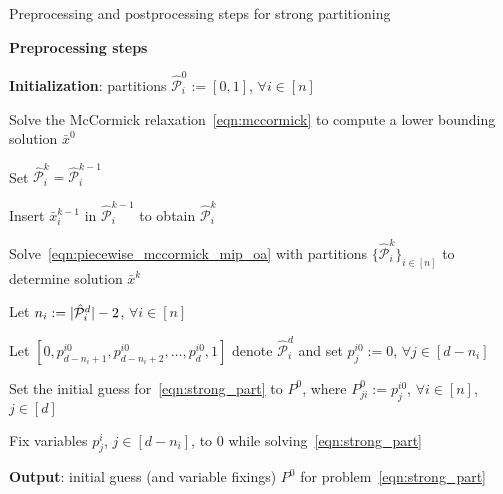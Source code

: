 \documentclass{article}
\DeclarePairedDelimiter\abs{\lvert}{\rvert}%
\begin{document}
\begin{algorithm}[t]
\caption{Preprocessing and postprocessing steps for strong partitioning}
\label{alg:enhancements}
{
\begin{algorithmic}[1]
\Statex \textbf{Preprocessing steps}

\vspace*{0.05in}
\State \textbf{Initialization}: partitions $\hat{\mathcal{P}}^0_i := [0, 1]$, $\forall i \in [n]$ \label{algo:preprocess_begin}

\State Solve the McCormick relaxation~\eqref{eqn:mccormick} to compute a lower bounding solution $\bar{x}^0$






\State Set $\hat{\mathcal{P}}^k_i = \hat{\mathcal{P}}^{k-1}_i$

\Else

\State Insert $\bar{x}^{k-1}_i$ in $\hat{\mathcal{P}}^{k-1}_i$ to obtain $\hat{\mathcal{P}}^k_i$

\EndIf


\EndFor


\State Solve~\eqref{eqn:piecewise_mccormick_mip_oa} with partitions $\{\hat{\mathcal{P}}^k_i\}_{i \in [n]}$ to determine solution $\bar{x}^k$


\EndFor


\vspace*{0.05in}

\State Let $n_i := \abs{\hat{\mathcal{P}}^d_i} - 2$, $\forall i \in [n]$

\State Let $[0, p^{i0}_{d-n_i+1}, p^{i0}_{d-n_i+2}, \dots, p^{i0}_d, 1]$ denote $\hat{\mathcal{P}}^d_i$ and set $p^{i0}_j := 0$, $\forall j \in [d-n_i]$

\State Set the initial guess for~\eqref{eqn:strong_part} to $P^0$, where $P^0_{ji} := p^{i0}_j$, $\forall i \in [n]$, $j \in [d]$

\State Fix variables $p^i_j$, $j \in [d-n_i]$, to $0$ while solving~\eqref{eqn:strong_part}

\State \textbf{Output}: initial guess (and variable fixings) $P^0$ for problem~\eqref{eqn:strong_part} \label{algo:preprocess_end}


\vspace*{0.15in}


\end{algorithmic}}
\end{algorithm}
\end{document}
